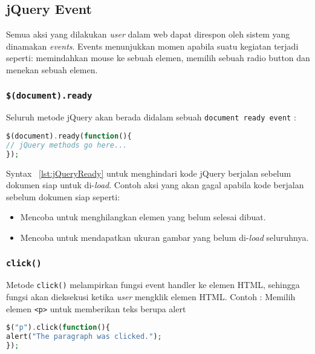 \subsection{jQuery Event}
Semua aksi yang dilakukan \textit{user} dalam web dapat direspon oleh sistem yang dinamakan \textit{events}. Events menunjukkan momen apabila suatu kegiatan terjadi seperti: memindahkan mouse ke sebuah elemen, memilih sebuah radio button dan menekan sebuah elemen.

\subsubsection{\texttt{\$(document).ready}}
Seluruh metode jQuery akan berada didalam sebuah \texttt{document ready event} :
\begin{lstlisting}[frame=single, language=PHP, label={lst:jQueryReady}, caption=jQuery document ready event.]
$(document).ready(function(){
// jQuery methods go here...
});
\end{lstlisting}

Syntax ~\ref{lst:jQueryReady} untuk menghindari kode jQuery berjalan sebelum dokumen siap untuk di-\textit{load}. Contoh aksi yang akan gagal apabila kode berjalan sebelum dokumen siap seperti:
\begin{itemize}
	\item Mencoba untuk menghilangkan elemen yang belum selesai dibuat.
	\item Mencoba untuk mendapatkan ukuran gambar yang belum di-\textit{load} seluruhnya.
\end{itemize}


\subsubsection{\texttt{click()}}
Metode \texttt{click()} melampirkan fungsi event handler ke elemen HTML, sehingga fungsi akan dieksekusi ketika \textit{user} mengklik elemen HTML.
Contoh : Memilih elemen \texttt{<p>} untuk memberikan teks berupa alert
\begin{lstlisting}[frame=single, language=PHP, label={lst:jQueryClick}, caption=jQuery click().]
$("p").click(function(){
alert("The paragraph was clicked.");
});

\end{lstlisting}

